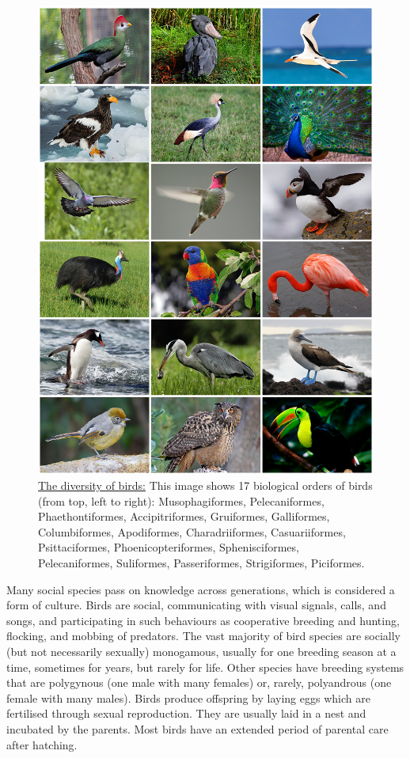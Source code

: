 \begin{figure}

{\centering \includegraphics[width=0.7\linewidth]{./figures/animals/Bird_Diversity_2013} 

}

\caption{\href{https://en.wikipedia.org/wiki/File:Bird_Diversity_2013.png}{The diversity of birds:} This image shows 17 biological orders of birds (from top, left to right): Musophagiformes, Pelecaniformes, Phaethontiformes, Accipitriformes, Gruiformes, Galliformes, Columbiformes, Apodiformes, Charadriiformes, Casuariiformes, Psittaciformes, Phoenicopteriformes, Sphenisciformes, Pelecaniformes, Suliformes, Passeriformes, Strigiformes, Piciformes.}\label{fig:birddiversity}
\end{figure}

Many social species pass on knowledge across generations, which is considered a form of culture. Birds are social, communicating with visual signals, calls, and songs, and participating in such behaviours as cooperative breeding and hunting, flocking, and mobbing of predators. The vast majority of bird species are socially (but not necessarily sexually) monogamous, usually for one breeding season at a time, sometimes for years, but rarely for life. Other species have breeding systems that are polygynous (one male with many females) or, rarely, polyandrous (one female with many males). Birds produce offspring by laying eggs which are fertilised through sexual reproduction. They are usually laid in a nest and incubated by the parents. Most birds have an extended period of parental care after hatching.

